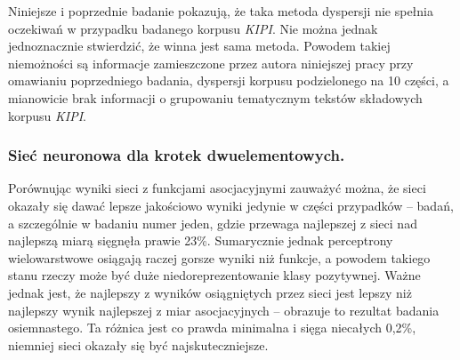 \documentclass[11pt,a4paper]{llncs}
\begin{document}
\par
Niniejsze i poprzednie badanie pokazują, że taka metoda dyspersji nie spełnia oczekiwań w przypadku badanego korpusu \emph{KIPI}.
Nie można jednak jednoznacznie stwierdzić, że winna jest sama metoda.
Powodem takiej niemożności są informacje zamieszczone przez autora niniejszej pracy przy omawianiu poprzedniego badania, dyspersji korpusu podzielonego na 10 części, a mianowicie brak informacji o grupowaniu tematycznym tekstów składowych korpusu \emph{KIPI}.


\subsubsection{Sieć neuronowa dla krotek dwuelementowych.}
Porównując wyniki sieci z funkcjami asocjacyjnymi zauważyć można, że sieci okazały się dawać lepsze jakościowo wyniki jedynie w części przypadków -- badań, a szczególnie w badaniu numer jeden, gdzie przewaga najlepszej z sieci nad najlepszą miarą sięgnęła prawie 23\%.
Sumarycznie jednak perceptrony wielowarstwowe osiągają raczej gorsze wyniki niż funkcje, a powodem takiego stanu rzeczy może być duże niedoreprezentowanie klasy pozytywnej. 
Ważne jednak jest, że najlepszy z wyników osiągniętych przez sieci jest lepszy niż najlepszy wynik najlepszej z miar asocjacyjnych -- obrazuje to rezultat badania osiemnastego.
Ta różnica jest co prawda minimalna i sięga niecałych 0,2\%, niemniej sieci okazały się być najskuteczniejsze.
\end{document}
